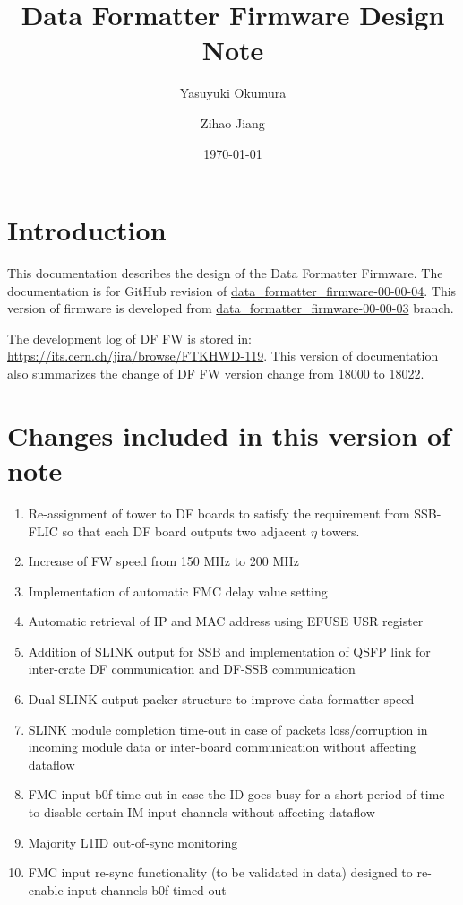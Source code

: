 \documentclass[11pt,letterpaper]{article}
\title{\bf Data Formatter Firmware Design Note}
\author{Yasuyuki Okumura}
\affil{University of Chicago, Chicago, Illinois 60637, USA}
\author{Zihao Jiang}
\affil{Stanford University, Stanford, California, 94305, USA}
\date{\today}
\begin{document}
\maketitle

\begin{abstract}
\end{abstract}

\section{Introduction}

This documentation describes the design of the Data Formatter Firmware. The documentation is for GitHub revision of \url{data_formatter_firmware-00-00-04}. This version of firmware is developed from \url{data_formatter_firmware-00-00-03} branch.

The development log of DF FW is stored in: \url{https://its.cern.ch/jira/browse/FTKHWD-119}. This version of documentation also summarizes the change of DF FW version change from 18000 to 18022. 

\section{Changes included in this version of note}
\begin{enumerate}

 \item Re-assignment of tower to DF boards to satisfy the requirement from SSB-FLIC so that each DF board outputs two adjacent $\eta$ towers. 
 \item Increase of FW speed from 150 MHz to 200 MHz
 \item Implementation of automatic FMC delay value setting
 \item Automatic retrieval of IP and MAC address using EFUSE USR register
 \item Addition of SLINK output for SSB and implementation of QSFP link for inter-crate DF communication and DF-SSB communication
 \item Dual SLINK output packer structure to improve data formatter speed
 \item SLINK module completion time-out in case of packets loss/corruption in incoming module data or inter-board communication without affecting dataflow
 \item FMC input b0f time-out in case the ID goes busy for a short period of time to disable certain IM input channels without affecting dataflow
 \item Majority L1ID out-of-sync monitoring 
 \item FMC input re-sync functionality (to be validated in data) designed to re-enable input channels b0f timed-out 

\end{enumerate}
\end{document}
